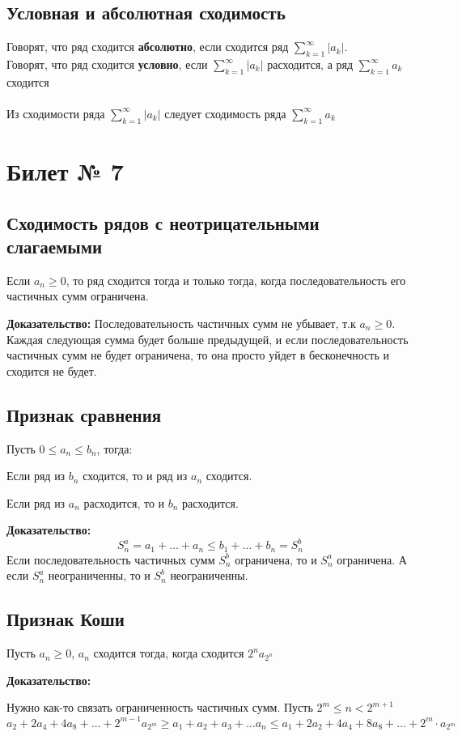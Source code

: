 \documentclass[a4paper,12pt]{article}
\begin{document}
\subsection*{Условная и абсолютная сходимость}
Говорят, что ряд сходится \textbf{абсолютно}, если сходится ряд $\sum\limits_{k=1}^{\infty}|a_k|$.
\\
Говорят, что ряд сходится \textbf{условно}, если $\sum\limits_{k=1}^{\infty}|a_k|$ расходится, а ряд $\sum\limits_{k=1}^{\infty}a_k$ сходится
\\\\
Из сходимости ряда $\sum\limits_{k=1}^{\infty}|a_k|$ следует сходимость ряда $\sum\limits_{k=1}^{\infty}a_k$
\newpage
\section*{Билет № 7}
\subsection*{Сходимость рядов с неотрицательными слагаемыми}
Если $a_n \geq 0$, то ряд сходится тогда и только тогда, когда последовательность его частичных сумм ограничена. 

\textbf{Доказательство:}
Последовательность частичных сумм не убывает, т.к $a_n \geq 0$. Каждая следующая сумма будет больше предыдущей, и если последовательность частичных сумм не будет ограничена, то она просто уйдет в бесконечность и сходится не будет. 
\subsection*{Признак сравнения}
Пусть $ 0 \leq a_n \leq b_n$, тогда:

Если ряд из $b_n$ сходится, то и ряд из $a_n$ сходится. 

Если ряд из $a_n$ расходится, то и $b_n$ расходится.

\textbf{Доказательство:}
\[
S_n^a = a_1 + \ldots + a_n \leq b_1 + \ldots + b_n = S_n^b
\]
Если последовательность частичных сумм $S_n^b$ ограничена,  то и $S_n^a$ ограничена. А если $S_n^a$ неограниченны, то и $S_n^b$ неограниченны.
\subsection*{Признак Коши}
Пусть $a_n \geq 0$, $a_n$ сходится тогда, когда сходится $2^n a_{2^n}$

\textbf{Доказательство:}

Нужно как-то связать ограниченность частичных сумм.
Пусть $2^m \leq n < 2^{m+1}$
\[
a_2 + 2a_4 + 4a_8 + \ldots + 2^{m-1}a_{2^m}
\geq 
a_1 + a_2 + a_3 + \ldots a_n \leq a_1 + 2a_2 + 4a_4 + 8a_8 + \ldots + 2^{m}\cdot a_{2^m}
\]
\end{document}
